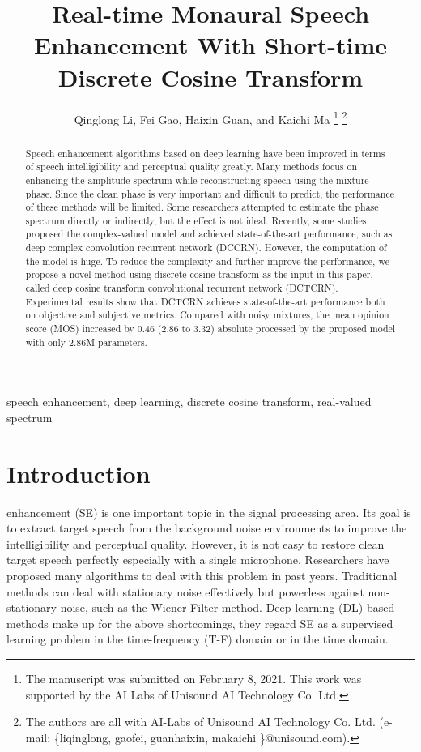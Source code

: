 \documentclass[journal,10pt]{IEEEtran}
\begin{document}
\title{Real-time Monaural Speech Enhancement With Short-time Discrete Cosine Transform}

\author{Qinglong Li, Fei Gao, Haixin Guan, and Kaichi Ma
\thanks{The manuscript was submitted on February 8, 2021. This work was supported by the AI Labs of Unisound AI Technology Co. Ltd.}
\thanks{The authors are all with AI-Labs of Unisound AI Technology Co. Ltd. (e-mail: \{liqinglong, gaofei, guanhaixin, makaichi \}@unisound.com).}
}

\maketitle

\begin{abstract}
Speech enhancement algorithms based on deep learning have been improved in terms of speech intelligibility and perceptual quality greatly. Many methods focus on enhancing the amplitude spectrum while reconstructing speech using the mixture phase. Since the clean phase is very important and difficult to predict, the performance of these methods will be limited. Some researchers attempted to estimate the phase spectrum directly or indirectly, but the effect is not ideal. Recently, some studies proposed the complex-valued model and achieved state-of-the-art performance, such as deep complex convolution recurrent network (DCCRN). However, the computation of the model is huge. To reduce the complexity and further improve the performance, we propose a novel method using discrete cosine transform as the input in this paper, called deep cosine transform convolutional recurrent network (DCTCRN). Experimental results show that DCTCRN achieves state-of-the-art performance both on objective and subjective metrics.  Compared with noisy mixtures, the mean opinion score (MOS) increased by 0.46 (2.86 to 3.32) absolute processed by the proposed model with only 2.86M parameters.
\end{abstract}

\begin{IEEEkeywords}
speech enhancement, deep learning, discrete cosine transform, real-valued spectrum
\end{IEEEkeywords}

\IEEEpeerreviewmaketitle

\section{Introduction}
 enhancement (SE) is one important topic in the signal processing area. Its goal is to extract target speech from the background noise environments to improve the intelligibility and perceptual quality. However, it is not easy to restore clean target speech perfectly especially with a single microphone. Researchers have proposed many algorithms to deal with this problem in past years. Traditional methods can deal with stationary noise effectively but powerless against non-stationary noise, such as the Wiener Filter method. Deep learning (DL) based methods make up for the above shortcomings, they regard SE as a supervised learning problem in the time-frequency (T-F) domain or in the time domain.
\end{document}
